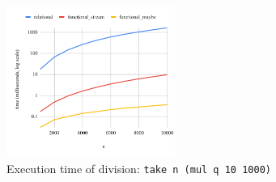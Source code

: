 \begin{figure}[h]
  \centering
\includegraphics[width=0.49\textwidth]{fig/maybe.pdf}
  \caption{Execution time of division: \lstinline{take n (mul q 10 1000)}}
  \label{fig:maybe}
\end{figure}
